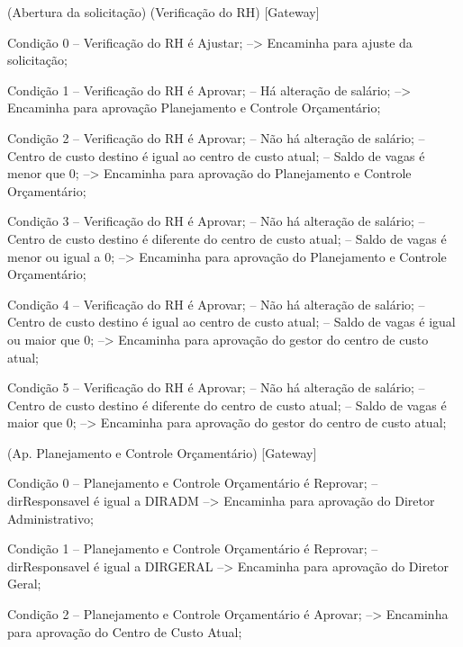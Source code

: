 
(Abertura da solicitação)
   (Verificação do RH)
      [Gateway]

         Condição 0
            -- Verificação do RH é Ajustar;
               --> Encaminha para ajuste da solicitação;

         Condição 1
            -- Verificação do RH é Aprovar;
            -- Há alteração de salário;
               --> Encaminha para aprovação Planejamento e Controle Orçamentário;

         Condição 2
            -- Verificação do RH é Aprovar;
            -- Não há alteração de salário;
            -- Centro de custo destino é igual ao centro de custo atual;
            -- Saldo de vagas é menor que 0;
               --> Encaminha para aprovação do Planejamento e Controle Orçamentário;

         Condição 3
            -- Verificação do RH é Aprovar;
            -- Não há alteração de salário;
            -- Centro de custo destino é diferente do centro de custo atual;
            -- Saldo de vagas é menor ou igual a 0;
               --> Encaminha para aprovação do Planejamento e Controle Orçamentário;

         Condição 4
            -- Verificação do RH é Aprovar;
            -- Não há alteração de salário;
            -- Centro de custo destino é igual ao centro de custo atual;
            -- Saldo de vagas é igual ou maior que 0;
               --> Encaminha para aprovação do gestor do centro de custo atual;

         Condição 5
            -- Verificação do RH é Aprovar;
            -- Não há alteração de salário;
            -- Centro de custo destino é diferente do centro de custo atual;
            -- Saldo de vagas é maior que 0;
               --> Encaminha para aprovação do gestor do centro de custo atual;


         (Ap. Planejamento e Controle Orçamentário)
            [Gateway]

               Condição 0
                  -- Planejamento e Controle Orçamentário é Reprovar;
                  -- dirResponsavel é igual a DIRADM
                     --> Encaminha para aprovação do Diretor Administrativo;

               Condição 1
                  -- Planejamento e Controle Orçamentário é Reprovar;
                  -- dirResponsavel é igual a DIRGERAL
                     --> Encaminha para aprovação do Diretor Geral;

               Condição 2
                  -- Planejamento e Controle Orçamentário é Aprovar;
                     --> Encaminha para aprovação do Centro de Custo Atual;

